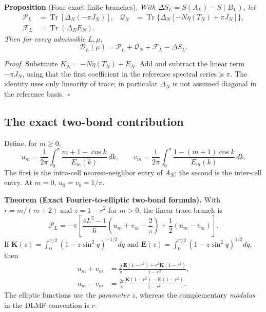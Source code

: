 \documentclass[
  10pt,
  a4paper,
]{article}
\begin{document}
\label{prop:four}
\textbf{Proposition} (Four exact finite branches). \emph{With \(\Delta S_L=S(A_L)-S(B_L)\), let \[\begin{aligned}
\mathcal P_L&=\operatorname{Tr}[\Delta_N(-\pi J_N)],&
\mathcal Q_N&=\operatorname{Tr}\{\Delta_N[-N\eta(T_N)+\pi J_N]\},\nonumber\\
\mathcal F_L&=\operatorname{Tr}(\Delta_NE_N).&&\label{eq:branches}
\end{aligned}\] Then for every admissible \(L,\mu\), \begin{equation}
\label{eq:four}
\boxed{\mathcal D_L(\mu)=\mathcal P_L+\mathcal Q_N+\mathcal F_L-\Delta S_L.}
\end{equation}}

\emph{Proof.} Substitute \(K_N=-N\eta(T_N)+E_N\). Add and subtract the linear term \(-\pi J_N\), using that the first coefficient in the reference spectral series is \(\pi\). The identity uses only linearity of trace; in particular \(\Delta_N\) is not assumed diagonal in the reference basis.~\(\square\)

\subsection{The exact two-bond contribution}\label{the-exact-two-bond-contribution}

Define, for \(m\ge0\), \begin{equation}
\label{eq:bonddefs}
u_m=\frac1{2\pi}\int_0^\pi\frac{m+1-\cos k}{E_m(k)}\,dk,\qquad
v_m=\frac1{2\pi}\int_0^\pi\frac{1-(m+1)\cos k}{E_m(k)}\,dk.
\end{equation} The first is the intra-cell nearest-neighbor entry of \(A_N\); the second is the inter-cell entry. At \(m=0\), \(u_0=v_0=1/\pi\).

\textbf{Theorem (Exact Fourier-to-elliptic two-bond formula).} With \(r=m/(m+2)\) and \(z=1-r^2\) for \(m>0\), the linear trace branch is \begin{equation}
\label{eq:twobond}
\mathcal P_L=-\pi\left[\frac{4L^2-1}{6}
\left(u_m+v_m-\frac2\pi\right)+\frac12(u_m-v_m)\right].
\end{equation} If \(\mathbf K(z)=\int_0^{\pi/2}(1-z\sin^2q)^{-1/2}dq\) and \(\mathbf E(z)=\int_0^{\pi/2}(1-z\sin^2q)^{1/2}dq\), then \begin{equation}
\label{eq:elliptic}
\begin{aligned}
u_m+v_m&=\frac2\pi\frac{\mathbf E(1-r^2)-r^2\mathbf K(1-r^2)}{1-r^2},\\
u_m-v_m&=\frac{2r}\pi\frac{\mathbf K(1-r^2)-\mathbf E(1-r^2)}{1-r^2}.
\end{aligned}
\end{equation} The elliptic functions use the \emph{parameter} \(z\), whereas the complementary \emph{modulus} in the DLMF convention is \(r\).
\end{document}
